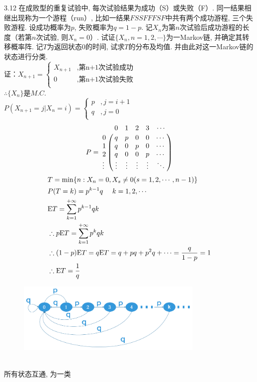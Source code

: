 3.12 在成败型的重复试验中, 每次试验结果为成功（S）或失败（F）. 同一结果相继出现称为一个游程（run）, 比如一结果$FSSFFFSF$中共有两个成功游程, 三个失败游程. 设成功概率为$p$, 失败概率为$q = 1 - p$. 记$X_n$为第$n$次试验后成功游程的长度（若第$n$次试验, 则$X_n = 0$）. 试证$\{X_n, n = 1,2,\cdots\}$为一Markov链, 并确定其转移概率阵. 记$T$为返回状态$0$的时间, 试求$T$的分布及均值. 并由此对这一Markov链的状态进行分类.\\
证：$
	X_{n+1} = \begin{cases}
				X_{n+1} & , \text{第n+1次试验成功}\\
				0 & , \text{第n+1次试验失败}\\
				\end{cases}
	$\\
	$\therefore \{X_n\}$是$M.C.$\\
	$P(X_{n+1} = j | X_n = i) = \begin{cases}
		p & , j = i + 1\\
		q & , j = 0\\
		\end{cases}$
	\[
	P = 
	\bordermatrix{
		~ & 0 & 1 & 2 & 3 & \cdots \cr
		0 & q & p & 0 & 0 & \cdots \cr
		1 & q & 0 & p & 0 & \cdots \cr
		2 & q & 0 & 0 & p & \cdots \cr
		\vdots & \vdots & \vdots & \vdots & \vdots & \ddots \cr
	}
	\]
	\[
	\begin{split}
	&T = \min \{n : X_n = 0, X_s \neq 0(s = 1,2,\cdots, n-1)\}\\
	&P(T = k) = p^{k-1}q~~~~k = 1, 2, \cdots\\
	&\mathrm{E} T = \sum^{+\infty}_{k=1}p^{k-1}qk\\
	&\therefore p\mathrm{E} T = \sum^{+\infty}_{k=1}p^kqk\\
	&\therefore (1-p)\mathrm{E} T = q\mathrm{E} T = q + pq + p^2q + \cdots = \frac{q}{1-p} = 1\\
	&\therefore \mathrm{E} T = \frac{1}{q}\\
	\end{split}
	\]
	\begin{figure}[htbp]
		\centering
		\includegraphics[width=0.8\textwidth]{../resource/sp3_12.png}
	\end{figure}\\
	所有状态互通, 为一类\\



